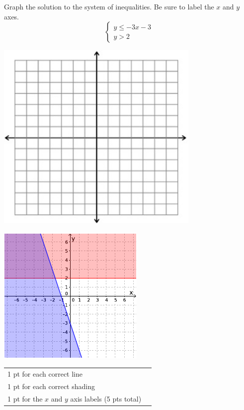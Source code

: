 {
	Graph the solution to the system of inequalities. Be sure to label the $x$ and $y$ axes. $$\begin{cases}y\leq -3x-3 \\ y>2 \end{cases}$$\begin{onlyproblem}\begin{center}\includegraphics{fig-graphpaper.png}\end{center}\end{onlyproblem} \begin{onlysolution}\begin{center}\includegraphics{fig095-12-5-b-answer}\end{center}\end{onlysolution}
	
}
{
	\begin{tabular}{l r}
	1 pt for each correct line\\
	1 pt for each correct shading\\
	1 pt for the $x$ and $y$ axis labels (5 pts total)\\
	\end{tabular}
}

